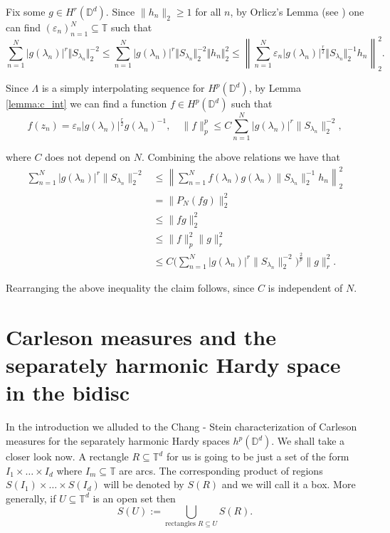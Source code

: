 \documentclass{amsart}
\numberwithin{equation}{section}
\newcommand{\D}{\mathbb{D}}
\begin{document}
Fix some $g\in H^r(\D^d)$. Since $\|h_n\|_{2}\ge1$ for all $n$, by Orlicz's Lemma (see \cite[Theorem 3.1.5]{Nikolski02}) one can find $(\varepsilon_n)_{n=1}^N\subseteq \mathbb{T}$ such that 
\[
\sum_{n=1}^N|g(\lambda_n)|^r \Vert S_{\lambda_n} \Vert^{-2}_2 \le \sum_{n=1}^N |g(\lambda_n)|^r \Vert S_{\lambda_n} \Vert^{-2}_2 \Vert h_n \Vert_2 ^2  \leq\left\|\sum_{n=1}^N\varepsilon_n |g(\lambda_n)|^{\frac{r}{2}} \Vert S_{\lambda_n} \Vert^{-1}_2 h_n\right\|_{2}^2.
\]

Since $\Lambda$ is a simply interpolating sequence for $H^p(\D^d)$, by Lemma \ref{lemma:c_int} we can find a function $f\in H^p(\mathbb{D}^d)$ such that 
\[ f(z_n) = \varepsilon_n |g(\lambda_n)|^{\frac{r}{2}}g(\lambda_n)^{-1}, \quad \| f \|^p_p \leq C \sum_{n=1}^N|g(\lambda_n)|^r \| S_{\lambda_n} \|_2^{-2}, \]

where $C$ does not depend on $N$. Combining the above relations we have that 
\begin{align*}
 \sum_{n=1}^N |g(\lambda_n)|^r \| S_{\lambda_n} \|_2^{-2} & \leq \left\| \sum_{n=1}^N f(\lambda_n) g(\lambda_n) \| S_{\lambda_n} \|_2^{-1} h_n \right\|_2^2 \\
 & = \| P_N(fg) \|_2^2 \\
 & \leq \| f g \|_2^2 \\
 & \leq \| f \|_p^2 \|g\|_r^2 \\
 & \leq C \Big( \sum_{n=1}^N|g(\lambda_n)|^r \| S_{\lambda_n} \|_2^{-2} \Big)^{\frac{2}{p}} \|g \|^2_r.
\end{align*}

Rearranging the above inequality the claim follows, since $C$ is independent of $N$.



\section{Carleson measures and the separately harmonic Hardy space in the bidisc}
\label{sec:Carleson}
In the introduction we alluded to the Chang - Stein characterization of Carleson measures for the separately harmonic Hardy spaces $h^p(\mathbb{D}^d)$. 
We shall take a closer look now. A rectangle $R\subseteq \mathbb{T}^d$ for us is going to be just a set of the form $I_1 \times \dots \times I_d$ where $I_m \subseteq \mathbb{T}$ are arcs. 
The corresponding product of regions $S(I_1)\times \dots \times S(I_d)$ will be denoted by $S(R)$ and we will call it a box. 
More generally, if $U\subseteq \mathbb{T}^d$ is an open set then 
\[ S(U):=\bigcup_{\text{rectangles} \,\, R \subseteq U} S(R). \]
\end{document}
